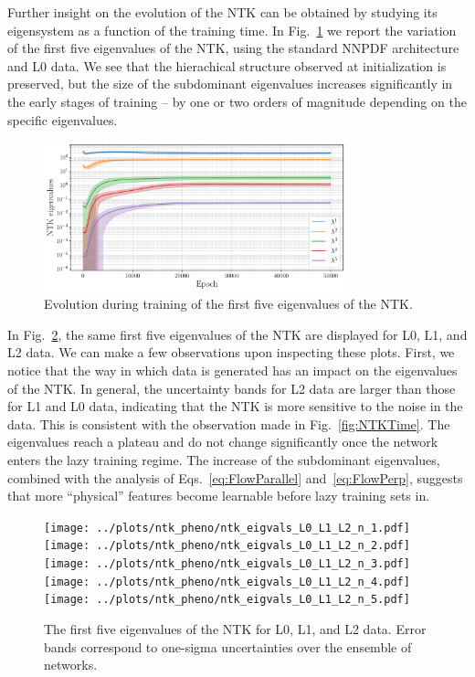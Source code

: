 Further insight on the evolution of the NTK can be obtained by studying its
eigensystem as a function of the training time. In
Fig.~\ref{fig:EigvalL0Training} we report the variation of the first five
eigenvalues of the NTK, using the standard NNPDF architecture and L0 data. We
see that the hierachical structure observed at initialization is preserved, but
the size of the subdominant eigenvalues increases significantly in the early
stages of training -- by one or two orders of magnitude depending on the
specific eigenvalues. 
\begin{figure}[ht!]
  \centering  
  \includegraphics[width=0.78\textwidth]{plots/ntk_pheno/ntk_eigvals_single_plot_L0.pdf}  
  \caption{Evolution during training of the first five eigenvalues of the NTK.}
  \label{fig:EigvalL0Training}
\end{figure}
In Fig.~\ref{fig:EigvalsComparison}, the same first five eigenvalues of the NTK
are displayed for L0, L1, and L2 data. We can make a few observations upon
inspecting these plots. First, we notice that the way in which data is generated
has an impact on the eigenvalues of the NTK. In general, the uncertainty bands
for L2 data are larger than those for L1 and L0 data, indicating that the NTK is
more sensitive to the noise in the data. This is consistent with the observation
made in Fig.~\ref{fig:NTKTime}. The eigenvalues reach a plateau and do not
change significantly once the network enters the lazy training regime. The
increase of the subdominant eigenvalues, combined with the analysis of
Eqs.~\eqref{eq:FlowParallel} and~\eqref{eq:FlowPerp}, suggests that more
``physical'' features become learnable before lazy training sets in. 

\begin{figure}[ht!]
  \centering
  \texttt{[image: ../plots/ntk\_pheno/ntk\_eigvals\_L0\_L1\_L2\_n\_1.pdf]}
  \texttt{[image: ../plots/ntk\_pheno/ntk\_eigvals\_L0\_L1\_L2\_n\_2.pdf]}
  \texttt{[image: ../plots/ntk\_pheno/ntk\_eigvals\_L0\_L1\_L2\_n\_3.pdf]}
  \texttt{[image: ../plots/ntk\_pheno/ntk\_eigvals\_L0\_L1\_L2\_n\_4.pdf]}
  \texttt{[image: ../plots/ntk\_pheno/ntk\_eigvals\_L0\_L1\_L2\_n\_5.pdf]}
  \vspace{0.5cm}
  \caption{The first five eigenvalues of the NTK for L0, L1, and L2 data. Error
  bands correspond to one-sigma uncertainties over the ensemble of networks.}
  \label{fig:EigvalsComparison}
\end{figure}

